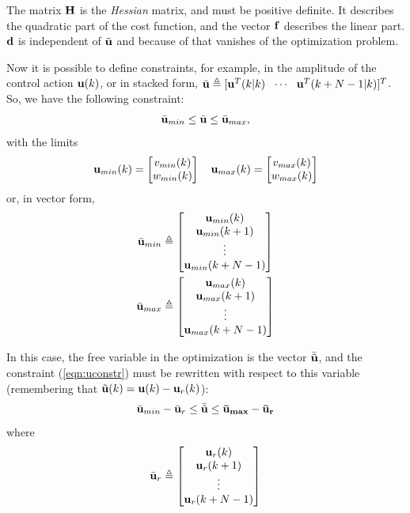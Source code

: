 \documentclass[twocolumn]{IEEEtran} %
\begin{document}
The matrix ${\bf H}$ is the {\em Hessian} matrix, and must be positive definite. It describes the quadratic part of the cost function, and the vector ${\bf f}$ describes the linear part. $\bf d$ is independent of $\tilde{\bf u}$ and because of that vanishes of the optimization problem.

Now it is possible to define constraints, for example, in the amplitude of the control action ${\bf u}(k)$, or in stacked form, $\bar {\bf u}\triangleq[{\bf u}^T(k|k)~~\cdots~~{\bf u}^T(k+N-1|k)]^T$. So, we have the following constraint:
\begin{equation}\label{eqn:uconstr}
	\bar{\bf u}_{min} \leq \bar{\bf u} \leq \bar{\bf u}_{max},
\end{equation}
with the limits 
\begin{equation*}
	{\bf u}_{min}(k) = \begin{bmatrix}
		v_{min}(k) \\ w_{min}(k)
	\end{bmatrix} \quad 
	{\bf u}_{max}(k) = \begin{bmatrix}
		v_{max}(k) \\ w_{max}(k)
	\end{bmatrix}
\end{equation*}
or, in vector form,
\begin{align*}
	\bar{\bf u}_{min} &\triangleq \begin{bmatrix}
		{\bf u}_{min}(k) \\ {\bf u}_{min}(k+1) \\ \vdots \\ {\bf u}_{min}(k+N-1)
	\end{bmatrix} \\
	\bar{\bf u}_{max} &\triangleq \begin{bmatrix}
		{\bf u}_{max}(k) \\ {\bf u}_{max}(k+1) \\ \vdots \\ {\bf u}_{max}(k+N-1)
	\end{bmatrix}
\end{align*}

In this case, the free variable in the optimization is the vector $\bar{\tilde{\bf u}}$, and the constraint (\ref{eqn:uconstr}) must be rewritten with respect to this variable (remembering that $\tilde{\bf u}(k)={\bf u}(k)-{\bf u}_r(k)$):
\begin{equation*}
	\bar{\bf u}_{min} - \bar{\bf u}_r \leq \bar{\tilde{\bf u}} \leq \bar{\bf u}_{max} - \bar{\bf u}_r
\end{equation*}
where
\begin{equation*}
	\bar{\bf u}_r \triangleq \begin{bmatrix}
		{\bf u}_r(k) \\ {\bf u}_r(k+1) \\ \vdots \\ {\bf u}_r(k+N-1)
	\end{bmatrix}
\end{equation*}
\end{document}
